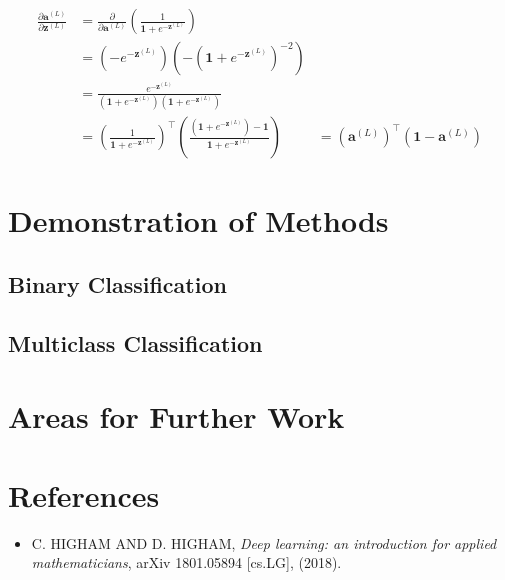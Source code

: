 \documentclass{article}
\begin{document}
        $$ \begin{aligned}
        \frac{\partial \mathbf{a}^{(L)}}{\partial \mathbf{z}^{(L)}}
            &= \frac{\partial}{\partial \mathbf{a}^{(L)}} \left( \frac{1}{\mathbf{1} + e^{-\mathbf{z}^{(L)}}} \right) \\
            &= \left( - e^{-\mathbf{z}^{(L)}} \right) \left( - \left( \mathbf{1} + e^{-\mathbf{z}^{(L)}} \right)^{-2} \right) \\
            &= \frac{e^{-\mathbf{z}^{(L)}}}{\left( \mathbf{1} + e^{-\mathbf{z}^{(L)}} \right) \left( \mathbf{1} + e^{-\mathbf{z}^{(L)}} \right)} \\
            &= \left( \frac{1}{\mathbf{1} + e^{-\mathbf{z}^{(L)}}} \right)^\top \left( \frac{\left( \mathbf{1} + e^{-\mathbf{z}^{(L)}} \right) - \mathbf{1}}{\mathbf{1} + e^{-\mathbf{z}^{(L)}}} \right)
            &= \left( \mathbf{a}^{(L)} \right)^\top \left( \mathbf{1} - \mathbf{a}^{(L)} \right)
        \end{aligned} $$



\section{Demonstration of Methods}

    \subsection{Binary Classification}
    
    \subsection{Multiclass Classification}
    



\section{Areas for Further Work}    




\section*{References}

	\begin{itemize}
	
		\item[] C. HIGHAM AND D. HIGHAM, \textit{Deep learning: an introduction for applied mathematicians}, arXiv 1801.05894 [cs.LG], (2018).

	\end{itemize}
\end{document}
